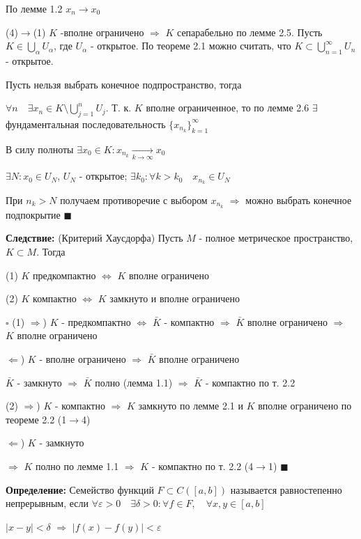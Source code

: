 \documentclass[a4paper]{report}
\begin{document}
По лемме 1.2 $x_n\to x_0$

(4)$\to$(1) $K$ -вполне ограничено $\Rightarrow$ $K$ сепарабельно по лемме 2.5. Пусть $K\in\bigcup\limits_\alpha U_\alpha$, 
где $U_\alpha$ - открытое. По теореме 2.1 можно считать, что $K\subset\bigcup\limits_{n=1}^\infty U_n$ - открытое.

Пусть нельзя выбрать конечное подпространство, тогда 

$\forall n\quad\exists x_n\in K\setminus\bigcup\limits_{j=1}^n U_j$. 
Т. к. $K$ вполне ограниченное, то по лемме 2.6 $\exists$ фундаментальная последовательность $\{x_{n_k}\}_{k=1}^\infty$
 
В силу полноты $\exists x_0\in K\colon x_{n_k}\xrightarrow[k\to\infty]{}x_0$

$\exists N\colon x_0\in U_N$, $U_N$ - открытое; $\exists k_0\colon\forall k>k_0\quad x_{n_k}\in U_N$

При $n_k>N$ получаем противоречие с выбором $x_{n_k}$ $\Rightarrow$ можно выбрать конечное подпокрытие $\blacksquare$
\bigskip

\noindent\textbf{Следствие:} (Критерий Хаусдорфа) Пусть $M$ - полное метрическое пространство, $K\subset M$. Тогда 

(1) $K$ предкомпактно $\Leftrightarrow$ $K$ вполне ограничено

(2) $K$ компактно $\Leftrightarrow$ $K$ замкнуто и вполне ограничено

\noindent $\square$ (1) $\Rightarrow$) $K$ - предкомпактно $\Leftrightarrow$ $\bar K$ - компактно $\Rightarrow$ $\bar K$ 
вполне ограничено $\Rightarrow$ $K$ вполне ограничено

$\Leftarrow$) $K$ - вполне ограничено $\Rightarrow$ $\bar K$ вполне ограничено
 
$\bar K$ - замкнуто $\Rightarrow$ $\bar K$ полно (лемма 1.1) $\Rightarrow$ $\bar K$ - компактно по т. 2.2 

(2) $\Rightarrow$) $K$ - компактно $\Rightarrow$ $K$ замкнуто по лемме 2.1 и $K$ вполне ограничено по теореме 2.2 (1$\to$4)

$\Leftarrow$) $K$ - замкнуто 

$\Rightarrow$ $K$ полно по лемме 1.1 $\Rightarrow$ $K$ - компактно по т. 2.2 
(4$\to$1) $\blacksquare$
\bigskip

\noindent\textbf{Определение:} Семейство функций $F\subset C([a,b])$ называется равностепенно непрерывным, если 
$\forall\varepsilon>0\quad\exists\delta>0\colon\forall f\in F,\quad\forall x,y\in[a,b]$  

$|x-y|<\delta$ $\Rightarrow$ $|f(x)-f(y)|<\varepsilon$
\bigskip
\end{document}
